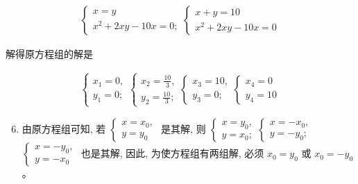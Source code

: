 \documentclass[10pt]{article}
\begin{document}
\begin{align*}
\left\{\begin{array} { l } 
{ x = y } \\
{ x ^ { 2 } + 2 x y - 1 0 x = 0 ; }
\end{array} \left\{\begin{array}{l}
x+y=10 \\
x^{2}+2 x y-10 x=0
\end{array}\right.\right.
\end{align*}

解得原方程组的解是

\begin{align*}
\left\{\begin{array} { l } 
{ x _ { 1 } = 0 , } \\
{ y _ { 1 } = 0 ; }
\end{array} \left\{\begin{array} { l } 
{ x _ { 2 } = \frac { 1 0 } { 3 } , } \\
{ y _ { 2 } = \frac { 1 0 } { 3 } ; }
\end{array} \left\{\begin{array} { l } 
{ x _ { 3 } = 1 0 , } \\
{ y _ { 3 } = 0 ; }
\end{array} \left\{\begin{array}{l}
x_{4}=0 \\
y_{4}=10
\end{array}\right.\right.\right.\right.
\end{align*}

\begin{enumerate}
  \setcounter{enumi}{5}
  \item 由原方程组可知, 若 $\left\{\begin{array}{l}x=x_{0}, \\ y=y_{0}\end{array}\right.$ 是其解, 则 $\left\{\begin{array}{l}x=y_{0}, \\ y=x_{0} ;\end{array}\left\{\begin{array}{l}x=-x_{0}, \\ y=-y_{0} ;\end{array}\right.\right.$ $\left\{\begin{array}{l}x=-y_{0}, \\ y=-x_{0}\end{array}\right.$ 也是其解, 因此, 为使方程组有两组解, 必须 $x_{0}=y_{0}$ 或 $x_{0}=-y_{0}$ 。
\end{enumerate}
\end{document}

